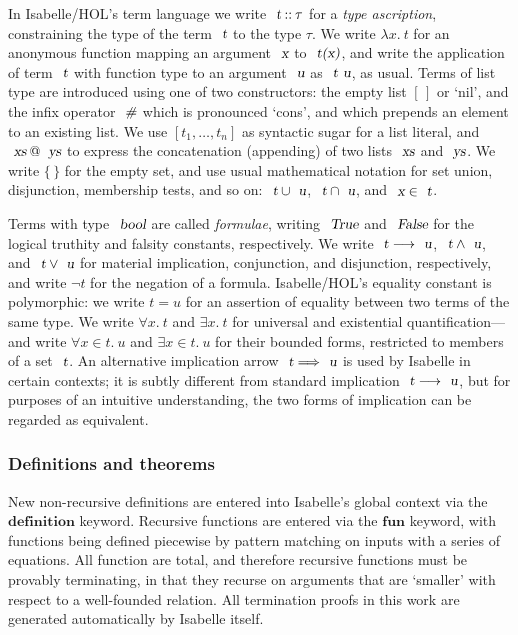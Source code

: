In Isabelle/HOL's term language we write $\isa{t} \mathbin{::} \tau$ for a \emph{type ascription}, constraining the type of the term $\isa{t}$ to the type $\tau$.
We write $\lambda{x}.\: t$ for an anonymous function mapping an argument $\isa{x}$ to $\isa{t(x)}$, and write the application of term $\isa{t}$ with function type to an argument $\isa{u}$ as $\isa{t\ u}$, as usual.
Terms of list type are introduced using one of two constructors: the empty list $[\,]$ or `nil', and the infix operator $\isa{\#}$ which is pronounced `cons', and which prepends an element to an existing list.
We use $[t_1, \ldots, t_n]$ as syntactic sugar for a list literal, and $\isa{xs} \mathbin{\isacharat} \isa{ys}$ to express the concatenation (appending) of two lists $\isa{xs}$ and $\isa{ys}$.
We write $\{\,\}$ for the empty set, and use usual mathematical notation for set union, disjunction, membership tests, and so on: $\isa{t} \cup \isa{u}$, $\isa{t} \cap \isa{u}$, and $\isa{x} \in \isa{t}$.

Terms with type $\isa{bool}$ are called \emph{formulae}, writing $\isa{True}$ and $\isa{False}$ for the logical truthity and falsity constants, respectively.
We write $\isa{t} \longrightarrow \isa{u}$, $\isa{t} \wedge \isa{u}$, and $\isa{t} \vee \isa{u}$ for material implication, conjunction, and disjunction, respectively, and write $\neg t$ for the negation of a formula.
Isabelle/HOL's equality constant is polymorphic: we write $t = u$ for an assertion of equality between two terms of the same type.
We write $\forall{x}.\: t$ and $\exists{x}.\: t$ for universal and existential quantification---and write $\forall{x{\in}t}.\: u$ and $\exists{x{\in}t}.\: u$ for their bounded forms, restricted to members of a set $\isa{t}$.
An alternative implication arrow $\isa{t} \Longrightarrow \isa{u}$ is used by Isabelle in certain contexts; it is subtly different from standard implication $\isa{t} \longrightarrow \isa{u}$, but for purposes of an intuitive understanding, the two forms of implication can be regarded as equivalent.

\subsubsection{Definitions and theorems}\label{sect.isabelle.definitions}

New non-recursive definitions are entered into Isabelle's global context via the $\mathbf{definition}$ keyword.
Recursive functions are entered via the $\mathbf{fun}$ keyword, with functions being defined piecewise by pattern matching on inputs with a series of equations.
All function are total, and therefore recursive functions must be provably terminating, in that they recurse on arguments that are `smaller' with respect to a well-founded relation.
All termination proofs in this work are generated automatically by Isabelle itself.

